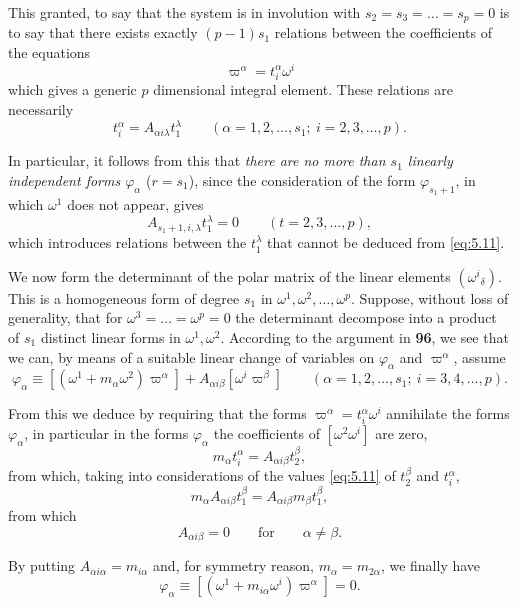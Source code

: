 \documentclass[leqno,11pt]{book}
\numberwithin{equation}{chapter}
\theoremstyle{shape1}
\theoremstyle{shape0}
\theoremstyle{shape2}
\theoremstyle{definition}
\begin{document}
This granted, to say that the system is in involution with $s_{2}=s_{3}=\dots=s_{p}=0$ is to say that there exists exactly $(p-1)s_{1}$ relations between the coefficients of the equations
\begin{equation}
  \label{eq:5.10}
  \varpi^{\alpha}=t_{i}^{\alpha}\omega^{i}
\end{equation}
which gives a generic $p$ dimensional integral element. These relations are necessarily
\begin{equation}
  \label{eq:5.11}
  t_{i}^{\alpha}=A_{\alpha i \lambda}t_{1}^{\lambda}\qquad(\alpha=1,2,\dots,s_{1};\ i=2,3,\dots,p).
\end{equation}

In particular, it follows from this that \emph{there are no more than $s_{1}$ linearly independent forms $\varphi_{\alpha}$} ($r=s_{1}$), since the consideration of the form $\varphi_{s_{1}+1}$, in which $\omega^{1}$ does not appear, gives
\[
A_{s_{1}+1,i,\lambda}t_{1}^{\lambda}=0\qquad(t=2,3,\dots,p),
\]
which introduces relations between the $t_{1}^{\lambda}$ that cannot be deduced from \eqref{eq:5.11}.

We now form the determinant of the polar matrix of the linear elements $(\omega^{i}{}_{\delta})$. This is a homogeneous form of degree $s_{1}$ in $\omega^{1},\omega^{2},\dots,\omega^{p}$. Suppose, without loss of generality, that for $\omega^{3}=\dots=\omega^{p}=0$ the determinant decompose into a product of $s_{1}$ distinct linear forms in $\omega^{1},\omega^{2}$. According to the argument in \textsection\textbf{96}, we see that we can, by means of a suitable linear change of variables on $\varphi_{\alpha}$ and $\varpi^{\alpha}$, assume
\[
\varphi_{\alpha}\equiv[(\omega^{1}+m_{\alpha}\omega^{2})\varpi^{\alpha}]+A_{\alpha i \beta}[\omega^{i}\varpi^{\beta}]\qquad(\alpha=1,2,\dots,s_{1};\ i=3,4,\dots,p).
\]

From this we deduce  by requiring that the forms $\varpi^{\alpha}=t_{i}^{\alpha}\omega^{i}$ annihilate the forms $\varphi_{\alpha}$, in particular in the forms $\varphi_{\alpha}$ the coefficients of $[\omega^{2}\omega^{i}]$ are zero,
\[
m_{\alpha}t_{i}^{\alpha}=A_{\alpha i\beta}t_{2}^{\beta},
\]
from which, taking into considerations of the values \eqref{eq:5.11} of $t_{2}^{\beta}$ and $t_{i}^{\alpha}$,
\[
m_{\alpha}A_{\alpha i\beta}t_{1}^{\beta}=A_{\alpha i \beta}m_{\beta}t_{1}^{\beta},
\]
from which
\[
A_{\alpha i \beta}=0\qquad\text{for}\qquad \alpha\neq \beta.
\]

By putting $A_{\alpha i\alpha}=m_{i\alpha}$ and, for symmetry reason, $m_{\alpha}=m_{2\alpha}$, we finally have
\begin{equation}
  \label{eq:5.12}
  \varphi_{\alpha}\equiv[(\omega^{1}+m_{i\alpha}\omega^{i})\varpi^{\alpha}]=0.
\end{equation}
\end{document}
